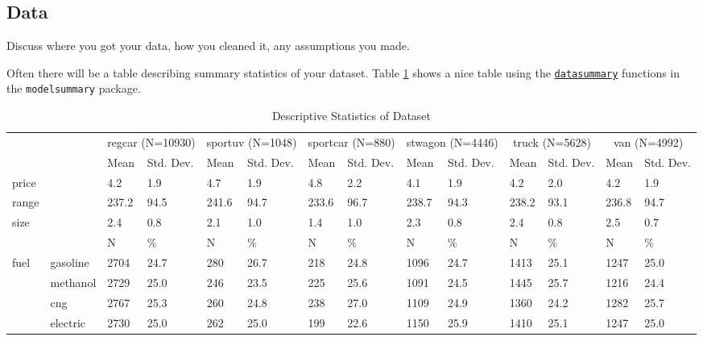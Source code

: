 \documentclass[3p, authoryear]{elsarticle} %
\begin{document}
\hypertarget{data}{%
\subsection{Data}\label{data}}

Discuss where you got your data, how you cleaned it, any assumptions you made.

Often there will be a table describing summary statistics of your dataset.
Table \ref{tab:datasummary} shows a nice table using the \href{https://vincentarelbundock.github.io/modelsummary/articles/datasummary.html}{\texttt{datasummary}}
functions in the \texttt{modelsummary} package.

\begin{table}

\caption{\label{tab:datasummary}Descriptive Statistics of Dataset}
\centering
\begin{tabular}[t]{llllllllllllll}
\toprule
\multicolumn{2}{c}{ } & \multicolumn{2}{c}{regcar (N=10930)} & \multicolumn{2}{c}{sportuv (N=1048)} & \multicolumn{2}{c}{sportcar (N=880)} & \multicolumn{2}{c}{stwagon (N=4446)} & \multicolumn{2}{c}{truck (N=5628)} & \multicolumn{2}{c}{van (N=4992)} \\
\cmidrule(l{3pt}r{3pt}){3-4} \cmidrule(l{3pt}r{3pt}){5-6} \cmidrule(l{3pt}r{3pt}){7-8} \cmidrule(l{3pt}r{3pt}){9-10} \cmidrule(l{3pt}r{3pt}){11-12} \cmidrule(l{3pt}r{3pt}){13-14}
  &    & Mean & Std. Dev. & Mean  & Std. Dev.  & Mean   & Std. Dev.   & Mean    & Std. Dev.    & Mean     & Std. Dev.     & Mean      & Std. Dev.     \\
\midrule
price &  & 4.2 & 1.9 & 4.7 & 1.9 & 4.8 & 2.2 & 4.1 & 1.9 & 4.2 & 2.0 & 4.2 & 1.9\\
range &  & 237.2 & 94.5 & 241.6 & 94.7 & 233.6 & 96.7 & 238.7 & 94.3 & 238.2 & 93.1 & 236.8 & 94.7\\
size &  & 2.4 & 0.8 & 2.1 & 1.0 & 1.4 & 1.0 & 2.3 & 0.8 & 2.4 & 0.8 & 2.5 & 0.7\\
\midrule
 &  & N & \% & N & \% & N & \% & N & \% & N & \% & N & \%\\
fuel & gasoline & 2704 & 24.7 & 280 & 26.7 & 218 & 24.8 & 1096 & 24.7 & 1413 & 25.1 & 1247 & 25.0\\
 & methanol & 2729 & 25.0 & 246 & 23.5 & 225 & 25.6 & 1091 & 24.5 & 1445 & 25.7 & 1216 & 24.4\\
 & cng & 2767 & 25.3 & 260 & 24.8 & 238 & 27.0 & 1109 & 24.9 & 1360 & 24.2 & 1282 & 25.7\\
 & electric & 2730 & 25.0 & 262 & 25.0 & 199 & 22.6 & 1150 & 25.9 & 1410 & 25.1 & 1247 & 25.0\\
\bottomrule
\end{tabular}
\end{table}
\end{document}
